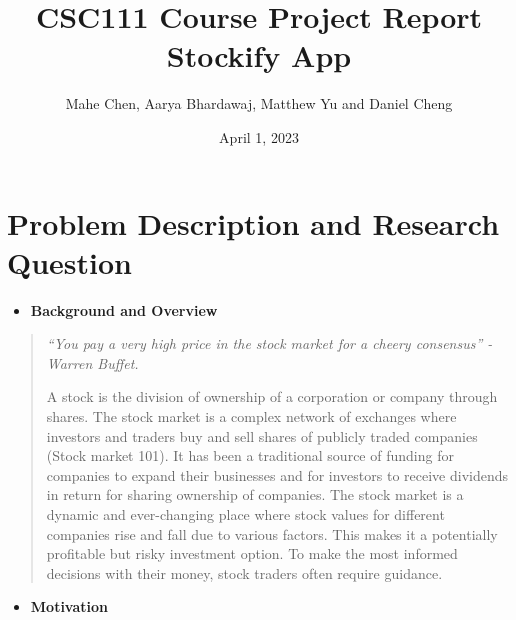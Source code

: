 \documentclass[fontsize=12pt]{article}
\title{%
  CSC111 Course Project Report \\
  \large Stockify App}
\author{Mahe Chen, Aarya Bhardawaj, Matthew Yu and Daniel Cheng}
\date{April 1, 2023}
\begin{document}
\maketitle

\section*{Problem Description and Research Question}

\begin{itemize}
\item

\textbf{Background and Overview}

\end{itemize}

\begin{quote}
\noindent \textit{“You pay a very high price in the stock market for a cheery consensus” - Warren Buffet.}

A stock is the division of ownership of a corporation or company through shares. The stock market is a complex network of exchanges where investors and traders buy and sell shares of publicly traded companies (Stock market 101). It has been a traditional source of funding for companies to expand their businesses and for investors to receive dividends in return for sharing ownership of companies. The stock market is a dynamic and ever-changing place where stock values for different companies rise and fall due to various factors. This makes it a potentially profitable but risky investment option. To make the most informed decisions with their money, stock traders often require guidance.
\end{quote}

\begin{itemize}
\item
  
  \textbf{Motivation}
 
\end{itemize}
\end{document}
